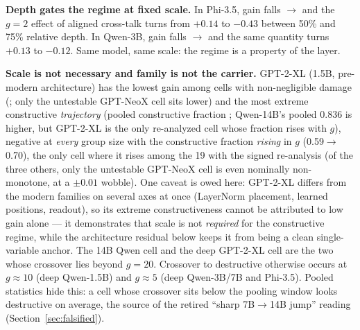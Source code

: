 \documentclass[preprint,12pt]{elsarticle}
\theoremstyle{definition}
\begin{document}
\textbf{Depth gates the regime at fixed scale.} In Phi-3.5, gain falls
\phiGainShallow{}$\to$\phiGainDeep{} and the $g{=}2$ effect of aligned cross-talk turns from
$+0.14$ to $-0.43$ between 50\% and 75\% relative depth. In Qwen-3B, gain falls
\qwenThreeBGainShallow{}$\to$\qwenThreeBGainDeep{} and the same quantity turns $+0.13$ to
$-0.12$. Same model, same scale: the regime is a property of the layer.

\textbf{Scale is not necessary and family is not the carrier.} GPT-2-XL (1.5B,
pre-modern architecture) has the lowest gain among cells with non-negligible damage
(\gainGptxlDeep{}; only the untestable GPT-NeoX cell sits lower) and the most
extreme constructive \emph{trajectory} (pooled constructive fraction
\fracGptxlDeep{}; Qwen-14B's pooled 0.836 is higher, but GPT-2-XL is the only
re-analyzed cell whose fraction rises with $g$), negative at
\emph{every} group size with the constructive fraction \emph{rising} in $g$ (0.59$\to$0.70),
the only cell where it rises among the 19 with the signed re-analysis (of the three
others, only the untestable GPT-NeoX cell is even nominally non-monotone, at a
$\pm0.01$ wobble). One caveat is owed here: GPT-2-XL differs from the
modern families on several axes at once (LayerNorm placement, learned positions,
readout), so its extreme constructiveness cannot be attributed to low gain alone ---
it demonstrates that scale is not \emph{required} for the constructive regime, while
the architecture residual below keeps it from being a clean single-variable anchor.
The 14B Qwen cell and the deep GPT-2-XL cell are the two whose
crossover lies beyond $g{=}20$. Crossover to destructive otherwise occurs at $g\approx10$
(deep Qwen-1.5B) and $g\approx5$ (deep Qwen-3B/7B and Phi-3.5). Pooled statistics hide this:
a cell whose crossover sits below the pooling window looks destructive on average, the
source of the retired ``sharp 7B$\to$14B jump'' reading (Section~\ref{sec:falsified}).
\end{document}
